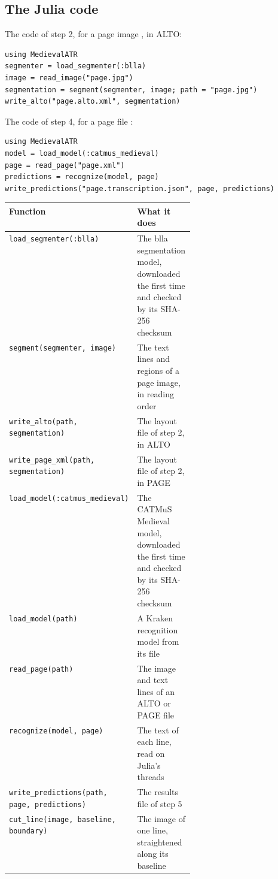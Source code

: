 \subsection{The Julia code}
The code of step 2, for a page image , in ALTO:
\begin{lstlisting}
using MedievalATR
segmenter = load_segmenter(:blla)
image = read_image("page.jpg")
segmentation = segment(segmenter, image; path = "page.jpg")
write_alto("page.alto.xml", segmentation)
\end{lstlisting}
The code of step 4, for a page file :
\begin{lstlisting}
using MedievalATR
model = load_model(:catmus_medieval)
page = read_page("page.xml")
predictions = recognize(model, page)
write_predictions("page.transcription.json", page, predictions)
\end{lstlisting}

\begin{center}\small
\begin{tabularx}{\linewidth}{@{}p{0.36\linewidth}L@{}}
\toprule
\textbf{Function} & \textbf{What it does} \\
\midrule
\texttt{load\_segmenter(:blla)} & The blla segmentation model, downloaded the first time and checked by its
  SHA-256 checksum \\
\texttt{segment(segmenter, image)} & The text lines and regions of a page image, in reading order \\
\texttt{write\_alto(path, segmentation)} & The layout file of step 2, in ALTO \\
\texttt{write\_page\_xml(path, segmentation)} & The layout file of step 2, in PAGE \\
\texttt{load\_model(:catmus\_medieval)} & The CATMuS Medieval model, downloaded the first time and checked by its
  SHA-256 checksum \\
\texttt{load\_model(path)} & A Kraken recognition model from its  file \\
\texttt{read\_page(path)} & The image and text lines of an ALTO or PAGE file \\
\texttt{recognize(model, page)} & The text of each line, read on Julia's threads \\
\texttt{write\_predictions(path, page, predictions)} & The results file of step 5 \\
\texttt{cut\_line(image, baseline, boundary)} & The image of one line, straightened along its baseline \\
\bottomrule
\end{tabularx}
\end{center}

